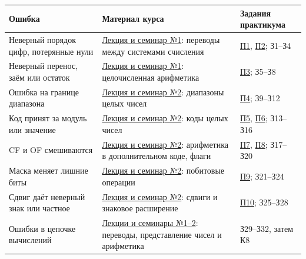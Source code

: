\begin{center}
\small
\begin{tabular}{>{\raggedright\arraybackslash}p{}|>{\raggedright\arraybackslash}p{}|>{\raggedright\arraybackslash}p{}}
Ошибка & Материал курса & Задания практикума\\\hline
Неверный порядок цифр, потерянные нули & \href{adaptation_course.pdf}{Лекция и семинар №1}: переводы между системами счисления & \hyperref[ex:p1]{П1}, \hyperref[ex:p2]{П2}; З1--З4\\[4pt]
Неверный перенос, заём или остаток & \href{adaptation_course.pdf}{Лекция и семинар №1}: целочисленная арифметика & \hyperref[ex:p3]{П3}; З5--З8\\[4pt]
Ошибка на границе диапазона & \href{adaptation_course.pdf}{Лекция и семинар №2}: диапазоны целых чисел & \hyperref[ex:p4]{П4}; З9--З12\\[4pt]
Код принят за модуль или значение & \href{adaptation_course.pdf}{Лекция и семинар №2}: коды целых чисел & \hyperref[ex:p5]{П5}, \hyperref[ex:p6]{П6}; З13--З16\\[4pt]
CF и OF смешиваются & \href{adaptation_course.pdf}{Лекция и семинар №2}: арифметика в дополнительном коде, флаги & \hyperref[ex:p7]{П7}, \hyperref[ex:p8]{П8}; З17--З20\\[4pt]
Маска меняет лишние биты & \href{adaptation_course.pdf}{Лекция и семинар №2}: побитовые операции & \hyperref[ex:p9]{П9}; З21--З24\\[4pt]
Сдвиг даёт неверный знак или частное & \href{adaptation_course.pdf}{Лекция и семинар №2}: сдвиги и знаковое расширение & \hyperref[ex:p10]{П10}; З25--З28\\[4pt]
Ошибки в цепочке вычислений & \href{adaptation_course.pdf}{Лекции и семинары №1--2}: переводы, представление чисел и арифметика & З29--З32, затем К8
\end{tabular}
\end{center}
